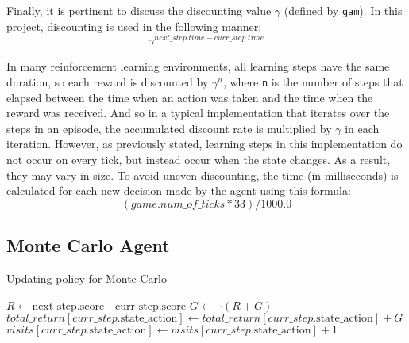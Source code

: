 Finally, it is pertinent to discuss the discounting value $\gamma$ (defined by \texttt{gam}). In this project, discounting is used in the following manner: $$\gamma^{next\_step.time - curr\_step.time}$$

In many reinforcement learning environments, all learning steps have the same duration, so each reward is discounted by $\gamma^{n}$, where \texttt{n} is the number of steps that elapsed between the time when an action was taken and the time when the reward was received.  And so in a typical implementation that iterates over the steps in an episode, the accumulated discount rate is multiplied by $\gamma$ in each iteration. However, as previously stated, learning steps in this implementation do not occur on every tick, but instead occur when the state changes. As a result, they may vary in size. To avoid uneven discounting, the time (in milliseconds) is calculated for each new decision made by the agent using this formula:  $$(game.num\_of\_ticks * 33) / 1000.0$$

\subsection{Monte Carlo Agent}

\begin{algorithm}
\caption{Updating policy for Monte Carlo}\label{mcUpdate}
\begin{algorithmic}[1]
\State $R \gets \text{next\_step.score - curr\_step.score}$
\State $G \gets $ $\cdot (R + G)$
\State $total\_return[curr\_step.\text{state\_action}] \gets total\_return[curr\_step.\text{state\_action}] + G$
\State $visits[curr\_step.\text{state\_action}] \gets visits[curr\_step.\text{state\_action}] + 1$
\EndIf
\end{algorithmic}
\end{algorithm}

